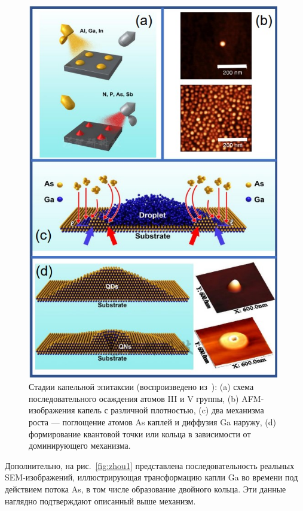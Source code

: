 \documentclass[14pt,oneside]{extarticle}
\begin{document}
\begin{figure}
    \begin{center}
        \includegraphics[width=11cm]{images/gurioli_fig1.jpg}
        \caption{\label{fig:gurioli1}
            Стадии капельной эпитаксии (воспроизведено из~\cite{gurioli2021}): (a) схема последовательного осаждения атомов III и V группы, (b) AFM-изображения капель с различной плотностью, (c) два механизма роста — поглощение атомов As каплей и диффузия Ga наружу, (d) формирование квантовой точки или кольца в зависимости от доминирующего механизма.}
    \end{center}
\end{figure}

Дополнительно, на рис.~\ref{fig:zhou1} представлена последовательность реальных SEM-изображений, иллюстрирующая трансформацию капли Ga во времени под действием потока As, в том числе образование двойного кольца. Эти данные наглядно подтверждают описанный выше механизм.
\end{document}
